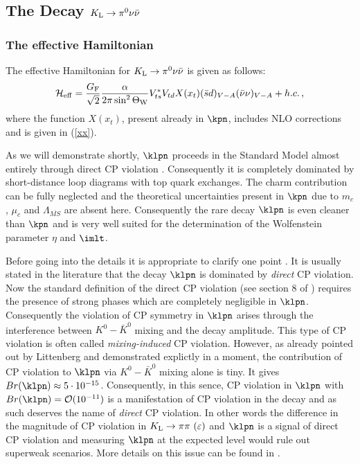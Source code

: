 \subsection{The Decay $K_{\rm L}\to\pi^0\nu\bar\nu$}
            \label{sec:HeffRareKB:klpinn1}
\subsubsection{The effective Hamiltonian}
The effective
Hamiltonian for $K_{\rm L}\to\pi^0\nu\bar\nu$
is given as follows:
\begin{equation}\label{hxnu}
{\cal H}_{\rm eff} = {G_{\rm F}\over \sqrt 2} {\alpha \over
2\pi \sin^2 \Theta_{\rm W}} V^\ast_{ts} V_{td}
X (x_t) (\bar sd)_{V-A} (\bar\nu\nu)_{V-A} + h.c.\,,   
\end{equation}
where the function $X(x_t)$, present already in $\kpn$,
includes NLO corrections and is given in (\ref{xx}). 

As we will demonstrate shortly, $\klpn$  proceeds in the Standard Model 
almost
entirely through direct CP violation \cite{littenberg:89}. Consequently it
is completely dominated by short-distance loop diagrams with top quark
exchanges. The charm contribution can be fully
neglected and the theoretical uncertainties present in $\kpn$ due to
$m_c$, $\mu_c$ and $\Lambda_{\overline{MS}}$ are absent here. 
Consequently the rare decay $\klpn$ is even cleaner than $\kpn$
and is very well suited for the determination of 
the Wolfenstein parameter $\eta$ and $\imlt$.

Before going into the details it is appropriate to clarify one point
\cite{NIR96,BUCH96}. It is usually stated in the literature that the
decay $\klpn$ is dominated by {\it direct} CP violation. Now
the standard definition of the direct CP violation (see section 8
of \cite{BF97}) requires the presence of strong phases which are
completely negligible in $\klpn$. Consequently the violation of
CP symmetry in $\klpn$ arises through the interference between
$K^0-\bar K^0$ mixing and the decay amplitude. This type of CP
violation is often called {\it mixing-induced} CP violation.
However, as already pointed out by Littenberg \cite{littenberg:89}
and demonstrated explictly in a moment,
the contribution of CP violation to $\klpn$ via $K^0-\bar K^0$ mixing 
alone is tiny. It gives $Br(\klpn) \approx 5\cdot 10^{-15}$.
Consequently, in this sence,  CP violation in $\klpn$ with
$Br(\klpn) = {\cal O}(10^{-11})$ is a manifestation of CP violation
in the decay and as such deserves the name of {\it direct} CP violation.
In other words the difference in the magnitude of CP violation in
$K_{\rm L}\to\pi\pi~(\varepsilon)$ and $\klpn$ is a signal of direct
CP violation and measuring $\klpn$ at the expected level would
rule out superweak scenarios. More details on this
issue can be found in \cite{NIR96,BUCH96,BB96}.
